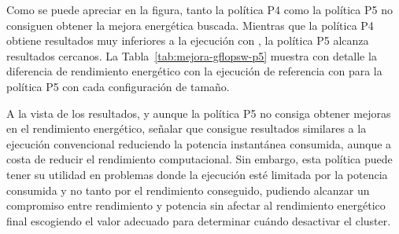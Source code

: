 Como se puede apreciar en la figura, tanto la política P4 como la política
P5 no consiguen obtener la mejora energética buscada. Mientras que la
política P4 obtiene resultados muy inferiores a la ejecución con \botlev,
la política P5 alcanza resultados cercanos. La
Tabla~\ref{tab:mejora-gflopsw-p5} muestra con detalle la diferencia de
rendimiento energético con la ejecución de referencia con \botlev para la
política P5 con cada configuración de tamaño.

A la vista de los resultados, y aunque la política P5 no consiga obtener
mejoras en el rendimiento energético, señalar que consigue resultados
similares a la ejecución convencional reduciendo la potencia instantánea
consumida, aunque a costa de reducir el rendimiento computacional. Sin
embargo, esta política puede tener su utilidad en problemas donde la
ejecución esté limitada por la potencia consumida y no tanto por el
rendimiento conseguido, pudiendo alcanzar un compromiso entre rendimiento y
potencia sin afectar al rendimiento energético final escogiendo el valor
adecuado para determinar cuándo desactivar el cluster.

